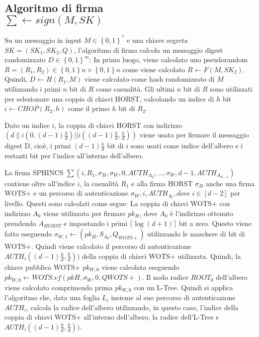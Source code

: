 \subsection{Algoritmo di firma\\\(\sum \leftarrow sign(M, SK)\)}
\label{sec:sign_algorithm}
Su un messaggio in input \(M \in \left\{0,1\right\}^*\) e una chiave segreta \(SK = \left(SK_1,SK_2,Q\right)\), l'algoritmo di firma calcola un messaggio digest randomizzato \(D \in \left\{0,1\right\}^m\): In primo luogo, viene calcolato uno pseudorandom \(R = (R_1, R_2) \in \left\{0, 1\right\}n \times \left\{0, 1\right\}n\) come viene calcolato \(R \leftarrow F(M, SK_2)\). Quindi, \(D \leftarrow H(R_1,M)\) viene calcolato come hash randomizzato di \(M\) utilizzando i primi \(n\) bit di \(R\) come casualità. Gli ultimi \(n\) bit di \(R\) sono utilizzati per selezionare una coppia di chiavi HORST, calcolando un indice di \(h\) bit \(i \leftarrow CHOP(R_2 , h)\) come il primo \(h\) bit di \(R_2\).

Dato un indice \(i\), la coppia di chiavi HORST con indirizzo \((d\|i(0, (d - 1)\frac{h}{d})||i((d - 1)\frac{h}{d}, \frac{h}{d}))\) viene usato per firmare il messaggio digest D, cioè, i primi \((d - 1)\frac{h}{d}\) bit di \(i\) sono usati come indice dell'albero e i restanti bit per l'indice all'interno dell'albero.

La firma SPHINCS \( \sum(i, R_1, \sigma_H, \sigma_W,0, AUTH_{A_0} , . . . , \sigma_W,d-1, AUTH_{A_{d-1}}) \) contiene oltre all'indice \(i\), la casualità \(R_1\) e alla firma HORST \(\sigma_H\) anche una firma WOTS+ e un percorso di autenticazione \(\sigma_W,i, AUTH_{A_i} , dove \; i \in [d-2]\) per livello. Questi sono calcolati come segue: La coppia di chiavi WOTS+ con indirizzo \(A_0\) viene utilizzata per firmare \(pk_H\), dove \(A_0\) è l'indirizzo ottenuto prendendo \(A_{HORST}\) e impostando i primi \(\lceil \log(d + 1)\rceil\) bit a zero. Questo viene fatto eseguendo \(\sigma_{W,1} \leftarrow (pk_H, S_{A_0} , Q_{WOTS+} )\) utilizzando le maschere di bit di WOTS+. Quindi viene calcolato il percorso di autenticazione \(AUTH_i((d-1)\frac{h}{d},\frac{h}{d}))\) della coppia di chiavi WOTS+ utilizzata. Quindi, la chiave pubblica WOTS+ \(pk_{W,0}\) viene calcolata eseguendo \\ \(pk_{W,0} \leftarrow WOTS.vf(pkH, \sigma_W, 0, QWOTS+)\). Il nodo radice \(ROOT_0\) dell'albero viene calcolato comprimendo prima \(pk_{W,0}\) con un L-Tree. Quindi si applica l'algoritmo che, data una foglia \(L_i\) insieme al suo percorso di autenticazione \(AUTH_i\), calcola la radice dell'albero utilizzando, in questo caso, l'indice della coppia di chiavi WOTS+ all'interno dell'albero, la radice dell'L-Tree e \(AUTH_i((d-1)\frac{h}{d},\frac{h}{d}))\).

